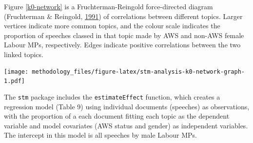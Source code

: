 \documentclass[]{article}
\let\origfigure\figure
\let\endorigfigure\endfigure
\renewenvironment{figure}[1][2] {
    \expandafter\origfigure\expandafter[H]
} {
    \endorigfigure
}
\begin{document}
Figure \ref{k0-network} is a Fruchterman-Reingold force-directed diagram
(Fruchterman \& Reingold, \protect\hyperlink{ref-fruchterman1991}{1991})
of correlations between different topics. Larger vertices indicate more
common topics, and the colour scale indicates the proportion of speeches
classed in that topic made by AWS and non-AWS female Labour MPs,
respectively. Edges indicate positive correlations between the two
linked topics.

\begin{figure}
\centering
\texttt{[image: methodology\_files/figure-latex/stm-analysis-k0-network-graph-1.pdf]}
\caption{\label{k0-network}Fruchterman-Reingold plot of Topic Network}
\end{figure}

The \texttt{stm} package includes the \texttt{estimateEffect} function,
which creates a regression model (Table 9) using individual documents
(speeches) as observations, with the proportion of a each document
fitting each topic as the dependent variable and model covariates (AWS
status and gender) as independent variables. The intercept in this model
is all speeches by male Labour MPs.
\end{document}
